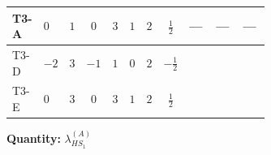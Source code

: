 \documentclass[8pt]{article}
\begin{document}
\begin{landscape}
\begin{longtable}{@{}llcccccc >{\raggedright\arraybackslash}p{0.21\linewidth} >{\raggedright\arraybackslash}p{0.21\linewidth} >{\raggedright\arraybackslash}p{0.21\linewidth}@{}}
\midrule
T3-A & $0$ & $1$ & $0$ & $3$ & $1$ & $2$ & $\frac{1}{2}$ & --- & --- & --- \\
\midrule
T3-D & $-2$ & $3$ & $-1$ & $1$ & $0$ & $2$ & $-\frac{1}{2}$ & \scriptsize\adjustbox{max width=\linewidth}{$\begin{gathered} +8 {\lambda_{HS_1}^{(1)}} {\lambda_{HS_1}^{(A)}}\end{gathered}$} & \scriptsize\adjustbox{max width=\linewidth}{$\begin{gathered} +2 {\lambda_{HS_1}^{(A)}} {\lambda_{S_1}^{(1)}}\end{gathered}$} & \scriptsize\adjustbox{max width=\linewidth}{$\begin{gathered} {\lambda_{HS_1}^{(A)}} (6 \operatorname{Tr}\!\left({Y_d}\,\left({Y_d}\right)^{\dagger}\right)+2 \operatorname{Tr}\!\left({Y_e}\,\left({Y_e}\right)^{\dagger}\right)+6 \operatorname{Tr}\!\left({Y_u}\,\left({Y_u}\right)^{\dagger}\right)+16 {\lambda_{S_1}^{(A)}})\end{gathered}$} \\
\midrule
T3-E & $0$ & $3$ & $0$ & $3$ & $1$ & $2$ & $\frac{1}{2}$ & \scriptsize\adjustbox{max width=\linewidth}{$\begin{gathered} +8 {\lambda_{HS_1}^{(1)}} {\lambda_{HS_1}^{(A)}}\end{gathered}$} & \scriptsize\adjustbox{max width=\linewidth}{$\begin{gathered} +2 {\lambda_{HS_1}^{(A)}} {\lambda_{S_1}^{(1)}}\end{gathered}$} & \scriptsize\adjustbox{max width=\linewidth}{$\begin{gathered} {\lambda_{HS_1}^{(A)}} (6 \operatorname{Tr}\!\left({Y_d}\,\left({Y_d}\right)^{\dagger}\right)+2 \operatorname{Tr}\!\left({Y_e}\,\left({Y_e}\right)^{\dagger}\right)+6 \operatorname{Tr}\!\left({Y_u}\,\left({Y_u}\right)^{\dagger}\right)+16 {\lambda_{S_1}^{(A)}})\end{gathered}$} \\
\midrule
\bottomrule
\end{longtable}
\clearpage
\noindent\textbf{Quantity: }$\lambda_{HS_1}^{(A)}$\par\smallskip

\end{landscape}
\end{document}
